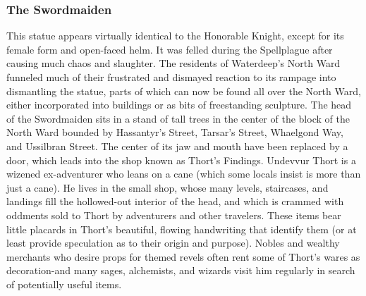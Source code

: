 \documentclass[10pt,a4paper,twoside,twocolumn,openany,nodeprecatedcode]{dndbook}
\begin{document}
\subsubsection{The Swordmaiden}
This statue appears virtually identical to the Honorable Knight, except for its female form and open-faced helm. It was felled during the Spellplague after causing much chaos and slaughter. The residents of Waterdeep's North Ward funneled much of their frustrated and dismayed reaction to its rampage into dismantling the statue, parts of which can now be found all over the North Ward, either incorporated into buildings or as bits of freestanding sculpture.
The head of the Swordmaiden sits in a stand of tall trees in the center of the block of the North Ward bounded by Hassantyr's Street, Tarsar's Street, Whaelgond Way, and Ussilbran Street. The center of its jaw and mouth have been replaced by a door, which leads into the shop known as Thort's Findings. Undevvur Thort is a wizened ex-adventurer who leans on a cane (which some locals insist is more than just a cane). He lives in the small shop, whose many levels, staircases, and landings fill the hollowed-out interior of the head, and which is crammed with oddments sold to Thort by adventurers and other travelers. These items bear little placards in Thort's beautiful, flowing handwriting that identify them (or at least provide speculation as to their origin and purpose). Nobles and wealthy merchants who desire props for themed revels often rent some of Thort's wares as decoration-and many sages, alchemists, and wizards visit him regularly in search of potentially useful items.
\end{document}

